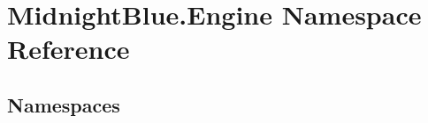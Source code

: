 \hypertarget{namespace_midnight_blue_1_1_engine}{}\section{Midnight\+Blue.\+Engine Namespace Reference}
\label{namespace_midnight_blue_1_1_engine}
\subsection*{Namespaces}
\begin{DoxyCompactItemize}
\end{DoxyCompactItemize}
